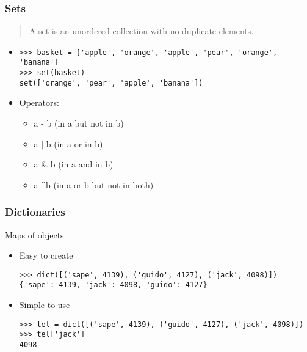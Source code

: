 \documentclass{beamer}
\begin{document}
\begin{frame}[fragile]
    \frametitle{Sets}
    \begin{quote}
        A set is an unordered collection with no duplicate elements. 
    \end{quote}
    \begin{itemize}
        \item<2-> \begin{verbatim}
>>> basket = ['apple', 'orange', 'apple', 'pear', 'orange', 'banana']
>>> set(basket)
set(['orange', 'pear', 'apple', 'banana'])
            \end{verbatim}
        \item<3-> Operators: 
            \begin{itemize}
                \item<4-> a - b (in a but not in b)
                \item<5-> a $\vert$ b (in a or in b)
                \item<6-> a \& b (in a and in b)
                \item<7-> a \textasciicircum  b (in a or b but not in both)
            \end{itemize}
    \end{itemize}
\end{frame}

\begin{frame}[fragile]
    \frametitle{Dictionaries}
    Maps of objects
    \begin{itemize}
        \item<2-> Easy to create 
            \begin{verbatim}
>>> dict([('sape', 4139), ('guido', 4127), ('jack', 4098)])
{'sape': 4139, 'jack': 4098, 'guido': 4127}
            \end{verbatim}
        \item<3-> Simple to use 
            \begin{verbatim}
>>> tel = dict([('sape', 4139), ('guido', 4127), ('jack', 4098)])
>>> tel['jack']
4098
            \end{verbatim}
    \end{itemize}
\end{frame}

\end{document}
